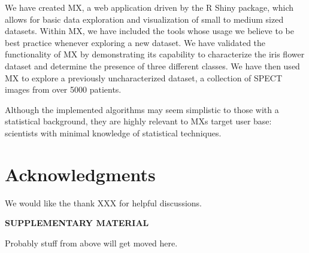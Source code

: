 \documentclass[12pt]{article}
\begin{document}
We have created MX, a web application driven by the R Shiny package, which allows for basic data exploration and visualization of small to medium sized datasets. Within MX, we have included the tools whose usage we believe to be best practice whenever exploring a new dataset. We have validated the functionality of MX by demonstrating its capability to characterize the iris flower dataset and determine the presence of three different classes. We have then used MX to explore a previously uncharacterized dataset, a collection of SPECT images from over 5000 patients.

Although the implemented algorithms may seem simplistic to those with a statistical background, they are highly relevant to MXs target user base: scientists with minimal knowledge of statistical techniques.

\section{Acknowledgments}
\label{sec:ack}
We would like the thank XXX for helpful discussions.

\bigskip
\begin{center}
{\large\bf SUPPLEMENTARY MATERIAL}
\end{center}

Probably stuff from above will get moved here.




\end{document}
